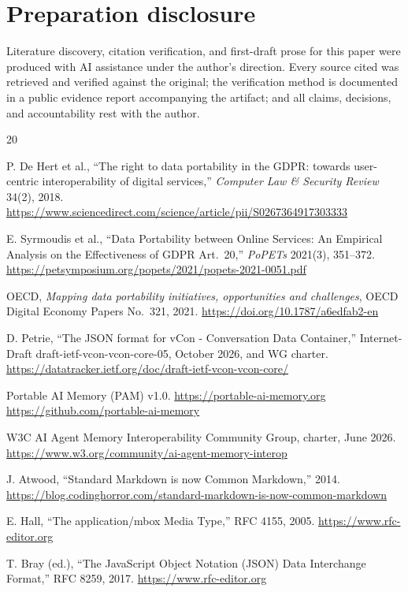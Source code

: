\documentclass[11pt]{article}
\begin{document}
\section*{Preparation disclosure}

Literature discovery, citation verification, and first-draft prose for this paper were produced with AI assistance under the author's direction. Every source cited was retrieved and verified against the original; the verification method is documented in a public evidence report accompanying the artifact; and all claims, decisions, and accountability rest with the author.

\begin{thebibliography}{20}

 P. De Hert et al., ``The right to data portability in the GDPR: towards user-centric interoperability of digital services,'' \emph{Computer Law \& Security Review} 34(2), 2018. \url{https://www.sciencedirect.com/science/article/pii/S0267364917303333}

 E. Syrmoudis et al., ``Data Portability between Online Services: An Empirical Analysis on the Effectiveness of GDPR Art.~20,'' \emph{PoPETs} 2021(3), 351--372. \url{https://petsymposium.org/popets/2021/popets-2021-0051.pdf}

 OECD, \emph{Mapping data portability initiatives, opportunities and challenges}, OECD Digital Economy Papers No.~321, 2021. \url{https://doi.org/10.1787/a6edfab2-en}

 D. Petrie, ``The JSON format for vCon - Conversation Data Container,'' Internet-Draft draft-ietf-vcon-vcon-core-05, October 2026, and WG charter. \url{https://datatracker.ietf.org/doc/draft-ietf-vcon-vcon-core/}

 Portable AI Memory (PAM) v1.0. \url{https://portable-ai-memory.org} \textperiodcentered{} \url{https://github.com/portable-ai-memory}

 W3C AI Agent Memory Interoperability Community Group, charter, June 2026. \url{https://www.w3.org/community/ai-agent-memory-interop}

 J. Atwood, ``Standard Markdown is now Common Markdown,'' 2014. \url{https://blog.codinghorror.com/standard-markdown-is-now-common-markdown}

 E. Hall, ``The application/mbox Media Type,'' RFC 4155, 2005. \url{https://www.rfc-editor.org}

 T. Bray (ed.), ``The JavaScript Object Notation (JSON) Data Interchange Format,'' RFC 8259, 2017. \url{https://www.rfc-editor.org}


\end{thebibliography}
\end{document}
